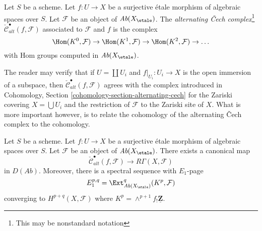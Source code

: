 \begin{definition}
\label{definition-alternating-cech-complex}
Let $S$ be a scheme. Let $f : U \to X$ be a surjective \'etale morphism
of algebraic spaces over $S$. Let $\mathcal{F}$ be an object of
$\textit{Ab}(X_\etale)$. The
{\it alternating {\v C}ech complex}\footnote{This may be nonstandard notation}
$\check{\mathcal{C}}^\bullet_{alt}(f, \mathcal{F})$
associated to $\mathcal{F}$ and $f$ is the complex
$$
\Hom(K^0, \mathcal{F}) \to \Hom(K^1, \mathcal{F}) \to
\Hom(K^2, \mathcal{F}) \to \ldots
$$
with Hom groups computed in $\textit{Ab}(X_\etale)$.
\end{definition}

\noindent
The reader may verify that if $U = \coprod U_i$ and $f|_{U_i} : U_i \to X$
is the open immersion of a subspace, then
$\check{\mathcal{C}}_{alt}^\bullet(f, \mathcal{F})$ agrees with the complex
introduced in
Cohomology, Section \ref{cohomology-section-alternating-cech}
for the Zariski covering $X = \bigcup U_i$ and the restriction
of $\mathcal{F}$ to the Zariski site of $X$. What is more important
however, is to relate the cohomology of the alternating
{\v C}ech complex to the cohomology.

\begin{lemma}
\label{lemma-alternating-cech-to-cohomology}
Let $S$ be a scheme. Let $f : U \to X$ be a surjective \'etale morphism
of algebraic spaces over $S$. Let $\mathcal{F}$ be an object of
$\textit{Ab}(X_\etale)$. There exists a canonical map
$$
\check{\mathcal{C}}^\bullet_{alt}(f, \mathcal{F})
\longrightarrow
R\Gamma(X, \mathcal{F})
$$
in $D(\textit{Ab})$. Moreover, there is a spectral sequence with $E_1$-page
$$
E_1^{p, q} =
\Ext_{\textit{Ab}(X_\etale)}^q(K^p, \mathcal{F})
$$
converging to $H^{p + q}(X, \mathcal{F})$ where
$K^p = \wedge^{p + 1}f_!\underline{\mathbf{Z}}$.
\end{lemma}


